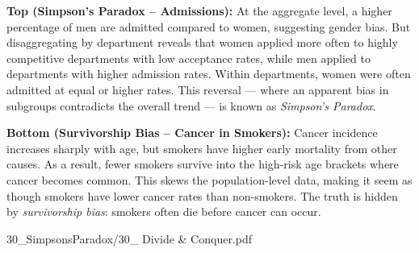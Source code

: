 \begin{SideNotePage}{
  \textbf{Top (Simpson’s Paradox – Admissions):}  
  At the aggregate level, a higher percentage of men are admitted compared to women, suggesting gender bias. But disaggregating by department reveals that women applied more often to highly competitive departments with low acceptance rates, while men applied to departments with higher admission rates. Within departments, women were often admitted at equal or higher rates. This reversal — where an apparent bias in subgroups contradicts the overall trend — is known as \emph{Simpson’s Paradox}. \par
  
  \textbf{Bottom (Survivorship Bias – Cancer in Smokers):}  
  Cancer incidence increases sharply with age, but smokers have higher early mortality from other causes. As a result, fewer smokers survive into the high-risk age brackets where cancer becomes common. This skews the population-level data, making it seem as though smokers have lower cancer rates than non-smokers. The truth is hidden by \emph{survivorship bias}: smokers often die before cancer can occur. \par
  
}{30_SimpsonsParadox/30_ Divide & Conquer.pdf}
\end{SideNotePage}

